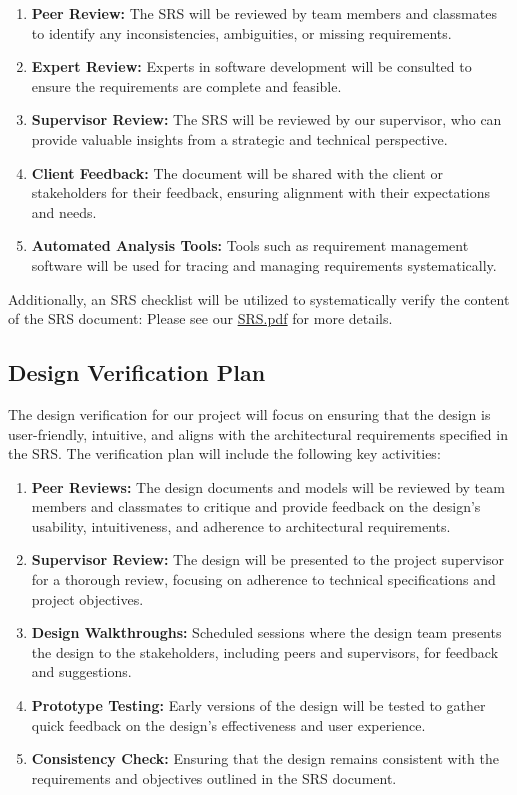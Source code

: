 \documentclass[12pt, titlepage]{article}
\begin{document}
\begin{enumerate}
    \item \textbf{Peer Review:} The SRS will be reviewed by team members and classmates to identify any inconsistencies, ambiguities, or missing requirements.
    \item \textbf{Expert Review:} Experts in software development will be consulted to ensure the requirements are complete and feasible.
    \item \textbf{Supervisor Review:} The SRS will be reviewed by our supervisor, who can provide valuable insights from a strategic and technical perspective.
    \item \textbf{Client Feedback:} The document will be shared with the client or stakeholders for their feedback, ensuring alignment with their expectations and needs.
    \item \textbf{Automated Analysis Tools:} Tools such as requirement management software will be used for tracing and managing requirements systematically.
\end{enumerate}

Additionally, an SRS checklist will be utilized to systematically verify the content of the SRS document:
Please see our \href{https://github.com/wangq131/4G06CapstoneProjectT5/blob/main/docs/SRS/SRS.pdf#page=2}{SRS.pdf} for more details.


\subsection{Design Verification Plan}

The design verification for our project will focus on ensuring that the design is user-friendly, intuitive, and aligns with the architectural requirements specified in the SRS. The verification plan will include the following key activities:

\begin{enumerate}
    \item \textbf{Peer Reviews:} The design documents and models will be reviewed by team members and classmates to critique and provide feedback on the design's usability, intuitiveness, and adherence to architectural requirements.
    \item \textbf{Supervisor Review:} The design will be presented to the project supervisor for a thorough review, focusing on adherence to technical specifications and project objectives.
    \item \textbf{Design Walkthroughs:} Scheduled sessions where the design team presents the design to the stakeholders, including peers and supervisors, for feedback and suggestions.
    \item \textbf{Prototype Testing:} Early versions of the design will be tested to gather quick feedback on the design's effectiveness and user experience.
    \item \textbf{Consistency Check:} Ensuring that the design remains consistent with the requirements and objectives outlined in the SRS document.
\end{enumerate}
\end{document}
